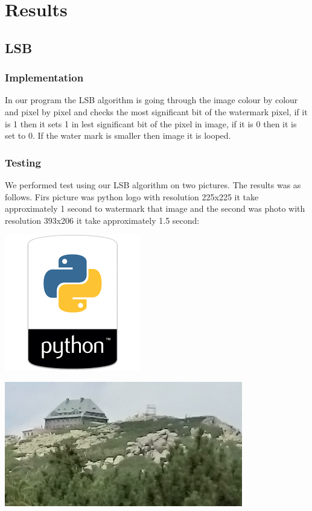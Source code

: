 \documentclass[a4paper, 12pt]{article}
\begin{document}
\section{Results}

	\subsection{LSB}

	    \subsubsection{Implementation}
    	In our program the LSB algorithm is going through the image colour by colour and pixel by pixel and checks the most significant bit of the watermark pixel, if it is 1 then it sets 1 in lest significant bit of the pixel in image, if it is 0 then it is set to 0. If the water mark is smaller then image it is looped.

    	\subsubsection{Testing}
    	We performed test using our LSB algorithm on two pictures. The results was as follows.
    	Firs picture was python logo with resolution 225x225 it take approximately 1 second to watermark that image and the second was photo with resolution 393x206 it take approximately 1.5 second:

        \begin{center}
            \includegraphics[scale=3.0]{python_lsb/python_original.png}
        \end{center}
        
        \begin{center}
            \includegraphics[scale=0.5]{photo_lsb/Photo_original.png}
        \end{center}
    	
\end{document}
